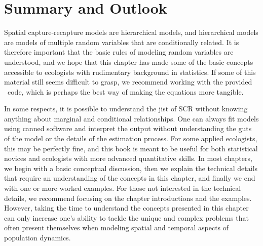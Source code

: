 \section{Summary and Outlook}


Spatial capture-recapture models are hierarchical models, and hierarchical
models are models of multiple random variables that are conditionally
related. It is therefore important that the basic rules of
modeling random variables are understood, and we hope that this chapter
has made some of the basic concepts accessible to ecologists with
rudimentary background in statistics. If some of this material still
seems difficult to grasp, we recommend working with the
provided \R~code, which is perhaps the best way of making the
equations more tangible.

In some respects, it is possible
to understand the jist of SCR without knowing anything about marginal
and conditional relationships. One can always fit models using canned
software and interpret the output without understanding the guts of
the model or the details of the estimation process. For some applied
ecologists, this may be perfectly fine, and this book is meant to be
useful for both statistical novices and ecologists with more advanced
quantitative skills. In most chapters, we begin with a basic conceptual
discussion, then we explain
the technical details that require an understanding of the concepts in
this chapter, and finally we end with one or more worked examples. For
those not interested in the technical details, we recommend focusing
on the chapter introductions and the examples. However, taking the
time to understand the concepts presented in this chapter can only
increase one's ability to tackle the unique and complex problems that
often present themselves when modeling spatial and temporal aspects of
population dynamics.

